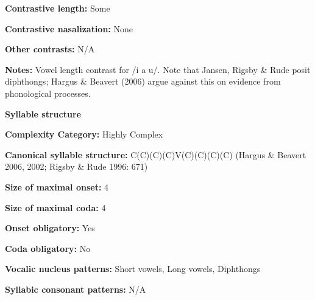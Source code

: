 \begin{styleBody}
\textbf{Contrastive length:} Some
\end{styleBody}

\begin{styleBody}
\textbf{Contrastive nasalization:} None
\end{styleBody}

\begin{styleBody}
\textbf{Other contrasts:} N/A
\end{styleBody}

\begin{styleBody}
\textbf{Notes:} Vowel length contrast for /i a u/. Note that Jansen, Rigsby \& Rude posit diphthongs; Hargus \& Beavert (2006) argue against this on evidence from phonological processes.
\end{styleBody}

\begin{styleBody}
\textbf{Syllable structure}
\end{styleBody}

\begin{styleBody}
\textbf{Complexity Category:} Highly Complex
\end{styleBody}

\begin{styleBody}
\textbf{Canonical syllable structure:} C(C)(C)(C)V(C)(C)(C)(C)\textbf{ }(Hargus \& Beavert 2006, 2002; Rigsby \& Rude 1996: 671)
\end{styleBody}

\begin{styleBody}
\textbf{Size of maximal onset:} 4
\end{styleBody}

\begin{styleBody}
\textbf{Size of maximal coda:} 4
\end{styleBody}

\begin{styleBody}
\textbf{Onset obligatory:} Yes
\end{styleBody}

\begin{styleBody}
\textbf{Coda obligatory:} No
\end{styleBody}

\begin{styleBody}
\textbf{Vocalic nucleus patterns:} Short vowels, Long vowels, Diphthongs
\end{styleBody}

\begin{styleBody}
\textbf{Syllabic consonant patterns:} N/A
\end{styleBody}

